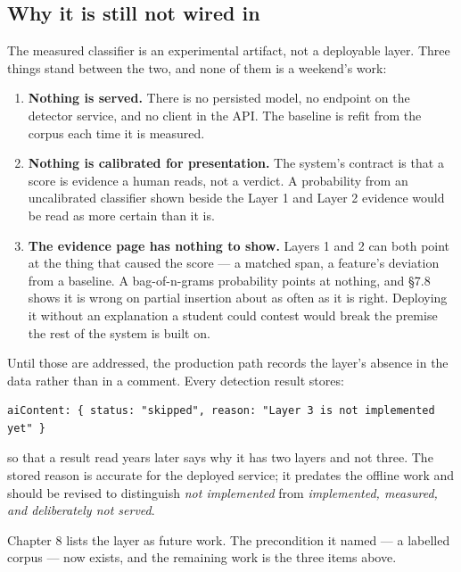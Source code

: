 \hypertarget{why-it-is-still-not-wired-in}{%
\subsection{Why it is still not wired
in}\label{why-it-is-still-not-wired-in}}

The measured classifier is an experimental artifact, not a deployable
layer. Three things stand between the two, and none of them is a
weekend's work:

\begin{enumerate}
\def\labelenumi{\arabic{enumi}.}
\tightlist
\item
  \textbf{Nothing is served.} There is no persisted model, no endpoint
  on the detector service, and no client in the API. The baseline is
  refit from the corpus each time it is measured.
\item
  \textbf{Nothing is calibrated for presentation.} The system's contract
  is that a score is evidence a human reads, not a verdict. A
  probability from an uncalibrated classifier shown beside the Layer 1
  and Layer 2 evidence would be read as more certain than it is.
\item
  \textbf{The evidence page has nothing to show.} Layers 1 and 2 can
  both point at the thing that caused the score --- a matched span, a
  feature's deviation from a baseline. A bag-of-n-grams probability
  points at nothing, and \S{}7.8 shows it is wrong on partial insertion
  about as often as it is right. Deploying it without an explanation a
  student could contest would break the premise the rest of the system
  is built on.
\end{enumerate}

Until those are addressed, the production path records the layer's
absence in the data rather than in a comment. Every detection result
stores:

\begin{verbatim}
aiContent: { status: "skipped", reason: "Layer 3 is not implemented yet" }
\end{verbatim}

so that a result read years later says why it has two layers and not
three. The stored reason is accurate for the deployed service; it
predates the offline work and should be revised to distinguish \emph{not
implemented} from \emph{implemented, measured, and deliberately not
served}.

Chapter 8 lists the layer as future work. The precondition it named ---
a labelled corpus --- now exists, and the remaining work is the three
items above.

